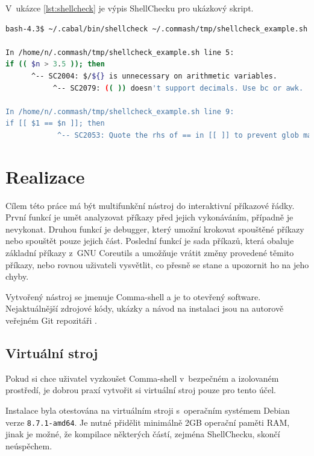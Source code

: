\documentclass[thesis=M,czech]{FITthesis}[2012/06/26]
\begin{document}
V~ukázce \ref{lst:shellcheck} je výpis ShellChecku pro ukázkový skript.

\noindent
\begin{minipage}{\linewidth}
\begin{lstlisting}[language=bash, caption={ShellCheck}, label={lst:shellcheck}]
bash-4.3$ ~/.cabal/bin/shellcheck ~/.commash/tmp/shellcheck_example.sh

In /home/n/.commash/tmp/shellcheck_example.sh line 5:
if (( $n > 3.5 )); then
      ^-- SC2004: $/${} is unnecessary on arithmetic variables.
           ^-- SC2079: (( )) doesn't support decimals. Use bc or awk.

In /home/n/.commash/tmp/shellcheck_example.sh line 9:
if [[ $1 == $n ]]; then
            ^-- SC2053: Quote the rhs of == in [[ ]] to prevent glob matching.
\end{lstlisting}
\end{minipage}



\chapter{Realizace}

Cílem této práce má být multifunkční nástroj do interaktivní příkazové řádky. První funkcí je umět analyzovat příkazy před jejich vykonáváním, případně je nevykonat. Druhou funkcí je debugger, který umožní krokovat spouštěné příkazy nebo spouštět pouze jejich část. Poslední funkcí je sada příkazů, která obaluje základní příkazy z~GNU Coreutils a umožňuje vrátit změny provedené těmito příkazy, nebo rovnou uživateli vysvětlit, co přesně se stane a upozornit ho na jeho chyby.

Vytvořený nástroj se jmenuje Comma-shell a je to otevřený software. Nejaktuálnější zdrojové kódy, ukázky a návod na instalaci jsou na autorově veřejném Git repozitáři \cite{commash}.

%
\section{Virtuální stroj}

Pokud si chce uživatel vyzkoušet Comma-shell v~bezpečném a izolovaném prostředí, je dobrou praxí vytvořit si virtuální stroj pouze pro tento účel.

Instalace byla otestována na virtuálním stroji s~operačním systémem Debian verze \texttt{8.7.1-amd64}. Je nutné přidělit  minimálně 2GB operační paměti RAM, jinak je možné, že kompilace některých částí, zejména ShellChecku, skončí neúspěchem.
\end{document}
